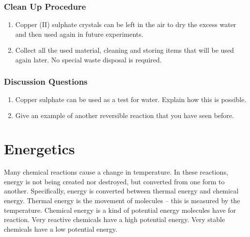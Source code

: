 \subsubsection*{Clean Up Procedure}
\begin{enumerate}
\item{Copper (II) sulphate crystals can be left in the air to dry the excess water and then used again in future experiments.}
\item{Collect all the used material, cleaning and storing items that will be used again later. No special waste disposal is required.}
\end{enumerate}

\subsubsection*{Discussion Questions}
\begin{enumerate}
\item{Copper sulphate can be used as a test for water. Explain how this is possible.}
\item{Give an example of another reversible reaction that you have seen before.}
\end{enumerate}


\section{Energetics}

Many chemical reactions cause a change in temperature. In these reactions, energy is not being created nor destroyed, but converted from one form to another. Specifically, energy is converted between thermal energy and chemical energy. Thermal energy is the movement of molecules -- this is measured by the temperature. Chemical energy is a kind of potential energy molecules have for reaction. Very reactive chemicals have a high potential energy. Very stable chemicals have a low potential energy.

